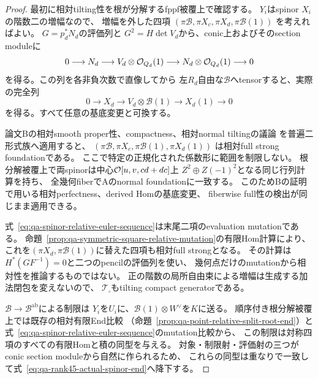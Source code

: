 \begin{proof}
最初に相対tilting性を根が分解するfppf被覆上で確認する。
$Y_i$はspinor $X_i$の階数二の増幅なので、
増幅を外した四項
$(\pi\mathcal B,\pi X_c,\pi X_d,\pi\mathcal B(1))$
を考えればよい。
$G=p_d^*N_d$の評価列と
$G^2=H\det V_d$から、conic上およびそのsection moduleに
\[
 0\longrightarrow N_d\longrightarrow
 V_d\otimes\mathcal O_{Q_d}(1)\longrightarrow
 N_d\otimes\mathcal O_{Q_d}(1)\longrightarrow0
\]
を得る。この列を各非負次数で直像してから
左$R_d$自由な$\mathcal B$へtensorすると、実際の完全列
\begin{equation}
 0\longrightarrow X_d\longrightarrow
 V_d\otimes\mathcal B(1)\longrightarrow X_d(1)
       \longrightarrow0
 \label{eq:qa-spinor-relative-euler-sequence}
\end{equation}
を得る。すべて任意の基底変更と可換する。

論文Bの相対smooth proper性、compactness、相対normal tiltingの議論
\cite[\texttt{prop:nc-relative-smooth},
\texttt{prop:nc-compact-generator},
\texttt{lem:nc-relative-normal-tilting}]{QuadricModuli2026}
を普遍二形式族へ適用すると、
$(\pi\mathcal B,\pi X_c,\pi\mathcal B(1),\pi X_d(1))$
は相対full strong foundationである。
ここで特定の正規化された係数形に範囲を制限しない。
根分解被覆上で両spinorは中心$\mathcal O[u,v,cd+dc]$上
$Z^2\oplus Z(-1)^2$となる同じ行列計算を持ち、
全幾何fiberでAのnormal foundationに一致する。
このためBの証明で用いる相対perfectness、derived Homの基底変更、
fiberwise full性の検出が同じまま適用できる。

式~\eqref{eq:qa-spinor-relative-euler-sequence}は末尾二項のevaluation mutationである。
命題~\ref{prop:qa-symmetric-square-relative-mutation}の有限Hom計算により、
これを$(\pi X_d,\pi\mathcal B(1))$に替えた四項も相対full strongとなる。
その計算は$H^*(GF^{-1})=0$と二つのpencilの評価列を使い、
幾何点だけのmutationから相対性を推論するものではない。
正の階数の局所自由束による増幅は生成する加法閉包を変えないので、
$\mathcal T_\square$もtilting compact generatorである。

$\mathcal B\to\mathcal B^{\mathrm{ab}}$による制限は
$Y_i$を$U_i$に、$\mathcal B(1)\otimes W^\vee$を$K$に送る。
順序付き根分解被覆上では既存の相対有限End比較
（命題~\ref{prop:qa-point-relative-split-root-end}）と
式~\eqref{eq:qa-spinor-relative-euler-sequence}のmutation比較から、
この制限は対称四項のすべての有限Homと積の同型を与える。
対象・制限射・評価射の三つがconic section moduleから自然に作られるため、
これらの同型は重なりで一致して式~\eqref{eq:qa-rank45-actual-spinor-end}へ降下する。


\end{proof}
